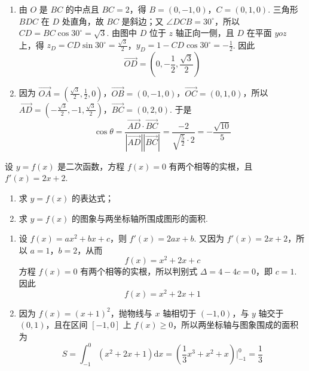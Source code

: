 \documentclass[UTF8,a4paper,oneside,11pt]{ctexbook}
\begin{document}
\begin{solution}
\begin{enumerate}
\item 由 \(O\) 是 \(BC\) 的中点且 \(BC=2\)，得 \(B=(0,-1,0)\)，\(C=(0,1,0)\). 三角形 \(BDC\) 在 \(D\) 处直角，故 \(BC\) 是斜边；又 \(\angle DCB=30^\circ\)，所以 \(CD=BC\cos30^\circ=\sqrt{3}\). 由图中 \(D\) 位于 \(z\) 轴正向一侧，且 \(D\) 在平面 \(yoz\) 上，得
\(z_D=CD\sin30^\circ=\frac{\sqrt{3}}{2}\)，\(y_D=1-CD\cos30^\circ=-\frac{1}{2}\).
因此
\[
\overrightarrow{OD}=\left(0,-\frac{1}{2},\frac{\sqrt{3}}{2}\right)
\]

\item 因为 \(\overrightarrow{OA}=\left(\frac{\sqrt{3}}{2},\frac{1}{2},0\right)\)，\(\overrightarrow{OB}=(0,-1,0)\)，\(\overrightarrow{OC}=(0,1,0)\)，所以
\(\overrightarrow{AD}=\left(-\frac{\sqrt{3}}{2},-1,\frac{\sqrt{3}}{2}\right)\)，\(\overrightarrow{BC}=(0,2,0)\).
于是
\[
\cos\theta=\frac{\overrightarrow{AD}\cdot\overrightarrow{BC}}{|\overrightarrow{AD}||\overrightarrow{BC}|}
=\frac{-2}{\sqrt{\frac{5}{2}}\cdot2}=-\frac{\sqrt{10}}{5}
\]
\end{enumerate}
\end{solution}

\begin{problem}[B]
设 \(y=f(x)\) 是二次函数，方程 \(f(x)=0\) 有两个相等的实根，且 \(f'(x)=2x+2\).

\begin{enumerate}
\item 求 \(y=f(x)\) 的表达式；
\item 求 \(y=f(x)\) 的图象与两坐标轴所围成图形的面积.
\end{enumerate}
\end{problem}

\begin{solution}
\begin{enumerate}
\item 设 \(f(x)=ax^2+bx+c\)，则 \(f'(x)=2ax+b\). 又因为 \(f'(x)=2x+2\)，所以 \(a=1\)，\(b=2\)，从而
\[
f(x)=x^2+2x+c
\]
方程 \(f(x)=0\) 有两个相等的实根，所以判别式 \(\Delta=4-4c=0\)，即 \(c=1\). 因此
\[
f(x)=x^2+2x+1
\]

\item 因为 \(f(x)=(x+1)^2\)，抛物线与 \(x\) 轴相切于 \((-1,0)\)，与 \(y\) 轴交于 \((0,1)\)，且在区间 \([-1,0]\) 上 \(f(x)\geqslant0\)，所以两坐标轴与图象围成的面积为
\[
S=\int_{-1}^{0}(x^2+2x+1)\mathrm{d}x
=\left(\frac{1}{3}x^3+x^2+x\right)\Big|_{-1}^{0}
=\frac{1}{3}
\]
\end{enumerate}
\end{solution}
\end{document}
